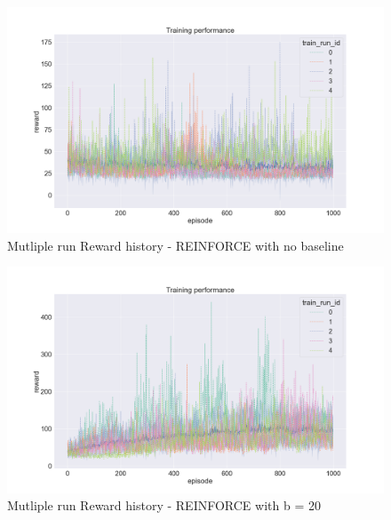 \documentclass{article}
\begin{document}



\begin{figure}[h]
	\centering
	\includegraphics[width=0.9\linewidth]{../data/plot/training_multiple_basic.png}
	\caption{Mutliple run Reward history - REINFORCE with no baseline}
	\label{fig:plot10}
\end{figure}

\begin{figure}[h]
	\centering
	\includegraphics[width=0.9\linewidth]{../data/plot/training_multiple_constant_baseline.png}
	\caption{Mutliple run Reward history - REINFORCE with b = 20}
	\label{fig:plot11}
\end{figure}
\end{document}
